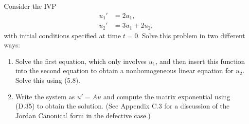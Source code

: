 

Consider the IVP
\begin{equation*}
\begin{split}
u_1' &= 2u_1,\\
u_2' &= 3u_1 + 2u_2,
\end{split}
\end{equation*}
with initial conditions specified at time $t=0$.  Solve this problem in two
different ways:

\begin{enumerate}
\item Solve the first equation, which only involves $u_1$, and then insert
this function into the second equation to obtain a nonhomogeneous linear
equation for $u_2$.  Solve this using (5.8).

\item Write the system as $u' = Au$ and compute the matrix exponential using
(D.35) to obtain the solution.  (See Appendix C.3 for a discussion of the
Jordan Canonical form in the defective case.)
\end{enumerate}

